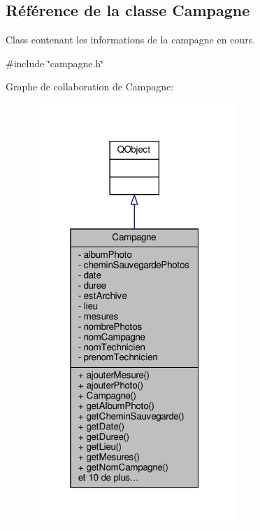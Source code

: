 \hypertarget{class_campagne}{}\subsection{Référence de la classe Campagne}
\label{class_campagne}


Class contenant les informations de la campagne en cours.  




{\ttfamily \#include \char`\"{}campagne.\+h\char`\"{}}



Graphe de collaboration de Campagne\+:
\nopagebreak
\begin{figure}[H]
\begin{center}
\leavevmode
\includegraphics[width=217pt]{class_campagne__coll__graph}
\end{center}
\end{figure}
